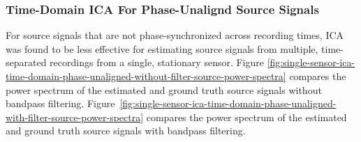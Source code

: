 \documentclass[10pt]{article}
\begin{document}
\subsubsection*{Time-Domain ICA For Phase-Unalignd Source Signals}
For source signals that are not phase-synchronized across recording times, ICA was found to
be less effective for estimating source signals from multiple, time-separated recordings
from a single, stationary sensor.
Figure \ref{fig:single-sensor-ica-time-domain-phase-unaligned-without-filter-source-power-spectra}
compares the power spectrum of the estimated and ground truth source signals without
bandpass filtering.
Figure~\ref{fig:single-sensor-ica-time-domain-phase-unaligned-with-filter-source-power-spectra}
compares the power spectrum of the estimated and ground truth source signals with bandpass
filtering.
\end{document}
